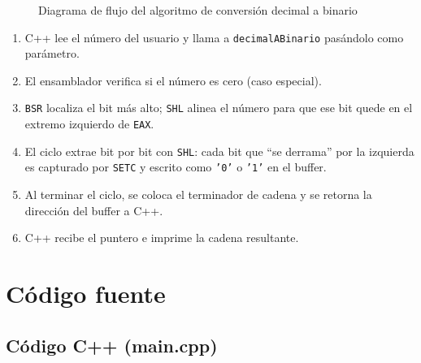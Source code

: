 \documentclass[12pt, letterpaper]{article}
\begin{document}
\begin{figure}[H]
{%
    }
    \caption{Diagrama de flujo del algoritmo de conversión decimal a binario}
\end{figure}

\begin{enumerate}
    \item C++ lee el número del usuario y llama a \texttt{decimalABinario} pasándolo como parámetro.
    \item El ensamblador verifica si el número es cero (caso especial).
    \item \texttt{BSR} localiza el bit más alto; \texttt{SHL} alinea el número para que ese bit quede en el extremo izquierdo de \texttt{EAX}.
    \item El ciclo extrae bit por bit con \texttt{SHL}: cada bit que ``se derrama'' por la izquierda es capturado por \texttt{SETC} y escrito como \texttt{'0'} o \texttt{'1'} en el buffer.
    \item Al terminar el ciclo, se coloca el terminador de cadena y se retorna la dirección del buffer a C++.
    \item C++ recibe el puntero e imprime la cadena resultante.
\end{enumerate}

\section{Código fuente}

\subsection{Código C++ (main.cpp)}
\end{document}
